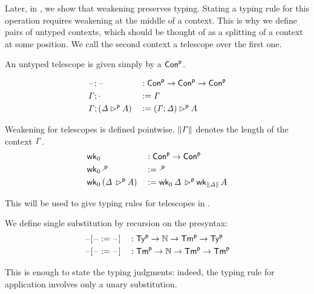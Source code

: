 Later, in , we show that weakening preserves
typing.  Stating a typing rule for this operation requires weakening
at the middle of a context. This is why we define pairs of untyped
contexts, which should be thought of as a splitting of a context at
some position. We call the second context a telescope over the first
one.
\begin{definition}
  An untyped telescope is given simply by a $\Conu$.
\end{definition}
\begin{definition}
\begin{alignat*}{5}
  & \blank \merge \blank && :  \Conu\ra\Conu\ra\Conu \\
  & \GG \merge \cdot && :=  \GG \\
  & \GG \merge (\GD \extu A) && :=  (\GG \merge \GD)\extu A
\end{alignat*}
\end{definition}
\begin{definition}
Weakening for telescopes is defined pointwise. $\length{\GG}$ denotes
the length of the context $\GG$.
\begin{alignat*}{5}
  & \wkO && : \Conu\ra \Conu
  \\
  & \wkO\,\emptyu && := \emptyu
  \\
  & \wkO\,(\GD\,\extu A) && := \wkO\,\GD\,\extu \wk_{\length{\GD}}\,A
  \end{alignat*}
\end{definition}
This will be used to give typing rules for telescopes
in .

\begin{definition}
  We define single substitution by recursion on the presyntax:
\begin{alignat*}{5}
  & \blank[\blank := \blank] && : \Tyu\ra\N\ra\Tmu\ra\Tyu \\
  & \blank[\blank := \blank] && : \Tmu\ra\N\ra\Tmu\ra\Tmu
\end{alignat*}
\end{definition}
  This is enough to state the typing judgments: indeed, the typing rule for application
  involves only a unary substitution.

